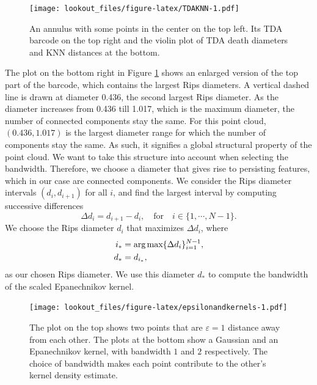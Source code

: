 \documentclass[11pt,a4paper,]{article}
\newcommand{\argmax}{\mathop{\text{arg\,max}}}
\theoremstyle{definition}
\theoremstyle{definition}
\theoremstyle{definition}
\theoremstyle{remark}
\begin{document}
\begin{figure}
\centering
\texttt{[image: lookout\_files/figure-latex/TDAKNN-1.pdf]}
\caption{\label{fig:TDAKNN}An annulus with some points in the center on the top left. Its TDA barcode on the top right and the violin plot of TDA death diameters and KNN distances at the bottom.}
\end{figure}

The plot on the bottom right in Figure \ref{fig:TDAKNN} shows an enlarged version of the top part of the barcode, which contains the largest Rips diameters. A vertical dashed line is drawn at diameter 0.436, the second largest Rips diameter. As the diameter increases from 0.436 till 1.017, which is the maximum diameter, the number of connected components stay the same. For this point cloud, \((0.436, 1.017)\) is the largest diameter range for which the number of components stay the same. As such, it signifies a global structural property of the point cloud. We want to take this structure into account when selecting the bandwidth. Therefore, we choose a diameter that gives rise to persisting features, which in our case are connected components. We consider the Rips diameter intervals \((d_i, d_{i+1})\) for all \(i\), and find the largest interval by computing successive differences
\begin{equation}\label{eq:deathrad1}
    \Delta d_i = d_{i+1} - d_i , \quad \text{for} \quad i \in \{1, \cdots, N-1 \}  .
\end{equation}
We choose the Rips diameter \(d_i\) that maximizes \(\Delta d_i\), where
\begin{align}\label{eq:deathrad2}
    i_* & = \argmax \{ \Delta d_i \}_{i=1}^{N-1}  , \notag \\
    d_* & = d_{i_*}  ,
\end{align}
as our chosen Rips diameter. We use this diameter \(d_*\) to compute the bandwidth of the scaled Epanechnikov kernel.

\begin{figure}
\centering
\texttt{[image: lookout\_files/figure-latex/epsilonandkernels-1.pdf]}
\caption{\label{fig:epsilonandkernels}The plot on the top shows two points that are \(\varepsilon = 1\) distance away from each other. The plots at the bottom show a Gaussian and an Epanechnikov kernel, with bandwidth \(1\) and \(2\) respectively. The choice of bandwidth makes each point contribute to the other's kernel density estimate.}
\end{figure}
\end{document}

